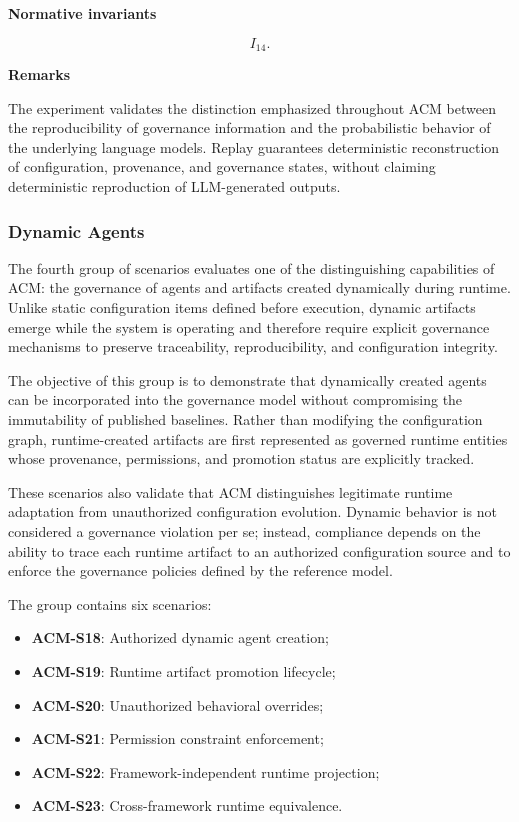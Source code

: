 \documentclass[10pt]{article}
\begin{document}
\textbf{Normative invariants}

\[
I_{14}.
\]

\textbf{Remarks}

The experiment validates the distinction emphasized throughout ACM between the
reproducibility of governance information and the probabilistic behavior of the
underlying language models. Replay guarantees deterministic reconstruction of
configuration, provenance, and governance states, without claiming
deterministic reproduction of LLM-generated outputs.

\subsubsection{Dynamic Agents}
\label{app:scenario_group_d}

The fourth group of scenarios evaluates one of the distinguishing capabilities
of ACM: the governance of agents and artifacts created dynamically during
runtime. Unlike static configuration items defined before execution, dynamic
artifacts emerge while the system is operating and therefore require explicit
governance mechanisms to preserve traceability, reproducibility, and
configuration integrity.

The objective of this group is to demonstrate that dynamically created agents
can be incorporated into the governance model without compromising the
immutability of published baselines. Rather than modifying the configuration
graph, runtime-created artifacts are first represented as governed runtime
entities whose provenance, permissions, and promotion status are explicitly
tracked.

These scenarios also validate that ACM distinguishes legitimate runtime
adaptation from unauthorized configuration evolution. Dynamic behavior is not
considered a governance violation per se; instead, compliance depends on the
ability to trace each runtime artifact to an authorized configuration source
and to enforce the governance policies defined by the reference model.

The group contains six scenarios:

\begin{itemize}
    \item \textbf{ACM-S18}: Authorized dynamic agent creation;
    \item \textbf{ACM-S19}: Runtime artifact promotion lifecycle;
    \item \textbf{ACM-S20}: Unauthorized behavioral overrides;
    \item \textbf{ACM-S21}: Permission constraint enforcement;
    \item \textbf{ACM-S22}: Framework-independent runtime projection;
    \item \textbf{ACM-S23}: Cross-framework runtime equivalence.
\end{itemize}
\end{document}
